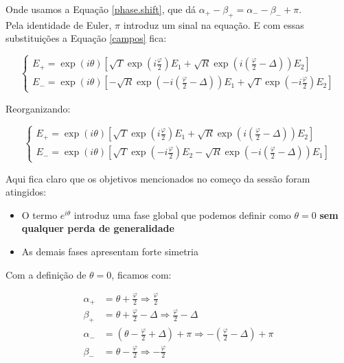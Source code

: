 \documentclass[12pt,a4paper]{report}
\begin{document}
Onde usamos a Equação \ref{phase.shift}, que dá $\alpha_+-\beta_+=\alpha_--\beta_-+\pi$.\\

Pela identidade de Euler, $\pi$ introduz um sinal na equação. E com essas substituições a Equação \ref{campos} fica:

\begin{equation}
    \begin{cases}
        E_+=\exp(i\theta)[\sqrt{T}\exp(i\frac{\varphi}{2})E_1+\sqrt{R}\exp(i(\frac{\varphi}{2}-\Delta))E_2] \\[0.3cm]
        E_-=\exp(i\theta)[-\sqrt{R}\exp(-i(\frac{\varphi}{2}-\Delta))E_1+\sqrt{T}\exp(-i\frac{\varphi}{2})E_2]
    \end{cases}
\end{equation}

Reorganizando:

\begin{equation}
    \begin{cases}
        E_+=\exp(i\theta)[\sqrt{T}\exp(i\frac{\varphi}{2})E_1+\sqrt{R}\exp(i(\frac{\varphi}{2}-\Delta))E_2] \\[0.3cm]
        E_-=\exp(i\theta)[\sqrt{T}\exp(-i\frac{\varphi}{2})E_2-\sqrt{R}\exp(-i(\frac{\varphi}{2}-\Delta))E_1]
    \end{cases}
    \label{campos.novo}
\end{equation}

Aqui fica claro que os objetivos mencionados no começo da sessão foram atingidos:

\begin{itemize}
    \item O termo $e^{i\theta}$ introduz uma fase global que podemos definir como $\theta=0$ \textbf{sem qualquer perda de generalidade}
    \item As demais fases apresentam forte simetria
\end{itemize}

Com a definição de $\theta=0$, ficamos com:

\begin{align*}
\alpha_+     & = \theta+\frac{\varphi}{2} \Rightarrow \frac{\varphi}{2}\\[0.3cm]
\beta_+      & = \theta+\frac{\varphi}{2}-\Delta \Rightarrow \frac{\varphi}{2}-\Delta\\[0.3cm]
\alpha_-     & = (\theta-\frac{\varphi}{2}+\Delta)+\pi \Rightarrow -(\frac{\varphi}{2}-\Delta)+\pi\\[0.3cm]
\beta_-      & = \theta-\frac{\varphi}{2} \Rightarrow -\frac{\varphi}{2}\\
\end{align*}
\end{document}
